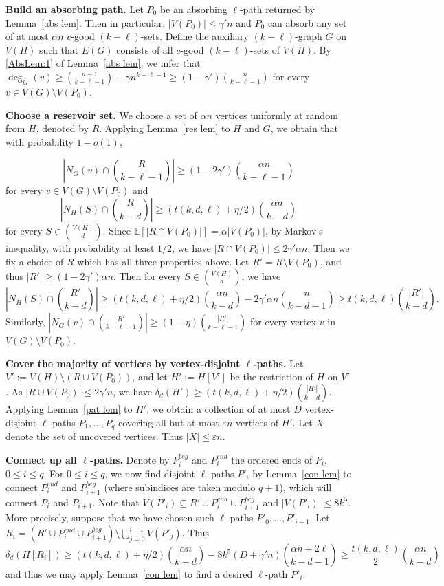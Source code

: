 \documentclass[11pt, reqno]{amsart}    	%
\theoremstyle{definition}
\numberwithin{equation}{section}
\begin{document}
	\textbf{Build an absorbing path.} 
	Let $P_{0}$ be an absorbing $\ell$-path returned by Lemma~\ref{abs lem}. 
	Then in particular, $|V(P_0)|\le\gamma'n$ and $P_{0}$ can absorb any set of at most $\alpha n $ $c$-good $(k-\ell)$-sets. 
	Define the auxiliary $(k-\ell)$-graph $G$ on $V(H)$ such that $E(G)$ consists of all $c$-good $(k-\ell)$-sets of $V(H)$. 
By \eqref{AbsLem:1} of Lemma~\ref{abs lem}, we infer that $\deg_{G}(v) \ge \binom{n-1}{k-\ell-1} -\gamma n^{k-\ell-1} \ge (1-\gamma')\binom{n}{k-\ell-1}$ for every $v \in V(G) \setminus V (P_{0})$.
	
	\textbf{Choose a reservoir set.} 
	We choose a set of $\alpha n$ vertices uniformly at random from $H$, denoted by $R$.
Applying Lemma~\ref{res lem} to $H$ and $G$, we obtain that with probability $1-o(1)$, 
	
	\[\left |N_{G}(v)\cap  \binom{R}{k-\ell-1}\right| \ge (1-2\gamma')\binom{\alpha n}{k-\ell-1}\]
	for every $v \in V(G) \setminus V (P_{0})$ and 
	\[\left |N_{H}(S)\cap  \binom{R}{k-d}\right| \ge (t(k,d,\ell)+\eta/2)\binom{\alpha n}{k-d}\]
	for every $S \in \binom{V(H)}{d}$. 
	Since $\mathbb{E}[|R \cap V(P_{0})|] = \alpha|V(P_{0})|$, by Markov's inequality, with probability at least $1/2$,  we have $|R \cap V(P_{0})| \le 2\gamma'\alpha n$. 
	Then we fix a choice of $R$ which has all three properties above. 
	Let $R' = R \setminus V(P_{0})$, and thus $|R'| \ge (1 - 2\gamma')\alpha n$. 
	Then for every $S \in \binom{V(H)}{d}$, we have
	\[ \left | N_{H}(S)\cap  \binom{R'}{k-d} \right |\ge (t(k,d,\ell)+\eta/2)\binom{\alpha n}{k-d}-2\gamma'\alpha n\binom{n}{k-d-1}\ge t(k,d,\ell)\binom{|R'|}{k-d}.\]  
	Similarly, $|N_{G}(v)\cap  \binom{R'}{k-\ell-1}| \ge (1-\eta)\binom{|R'|}{k-\ell-1}$ for every vertex $v$ in $V(G)\setminus V(P_0)$.
	
	\textbf{Cover the majority of vertices by vertex-disjoint $\ell$-paths.} 
	Let $V':=V(H)\setminus (R \cup V(P_{0}))$, and let $H':=H[V']$ be the restriction of $H$ on $V'$. 
	As $|R \cup V(P_{0})|\le2\gamma'n$, we have $\delta_d(H')\ge (t(k,d,\ell)+\eta/2) \binom{|H'|}{k-d}$. Applying Lemma~\ref{pat lem} to $H'$, we obtain a collection of at most $D$ vertex-disjoint $\ell$-paths $P_{1},\dots,P_{q}$ 
	covering all but at most $\varepsilon n$ vertices of $H'$.
	Let $X$ denote the set of uncovered vertices. Thus $|X| \le \varepsilon n$.
	
	\textbf{Connect up all $\ell$-paths.}   
	Denote by $P^{beg}_{i}$ and $P^{end}_{i}$ the ordered ends of $P_{i}$, $0 \le i \le q$. 
	For $0 \le i \le q$, we now find disjoint $\ell$-paths $P'_{i}$ by Lemma~\ref{con lem} to connect $P^{end}_{i}$
	and  $P^{beg}_{i+1}$ (where subindices are taken modulo $q+1$), which will connect $P_{i}$ and $P_{i+1}$. Note that  $V(P'_{i})\subseteq R' \cup P^{end}_{i} \cup P^{beg}_{i+1}$ and $|V(P'_{i})|\le 8k^{5}$.
	More precisely, suppose that we have chosen such $\ell$-paths  $P'_{0},\dots,P'_{i-1}$. Let $R_{i}=(R' \cup P^{end}_{i} \cup P^{beg}_{i+1})\setminus \bigcup_{j=0}^{i-1}V(P'_{j})$.  
	Thus 
	\[\delta_d(H[R_{i}])\ge ( t(k,d,\ell) +\eta/2)\binom{\alpha n}{k-d}-8k^{5}(D+\gamma' n ) \binom{\alpha n+2\ell}{k-d-1}\ge \frac{t(k,d,\ell)}{2}\binom{\alpha n}{k-d}\]
	and thus we may apply Lemma~\ref{con lem} to find a desired $\ell$-path  $P'_{i}$.
	
\end{document}
